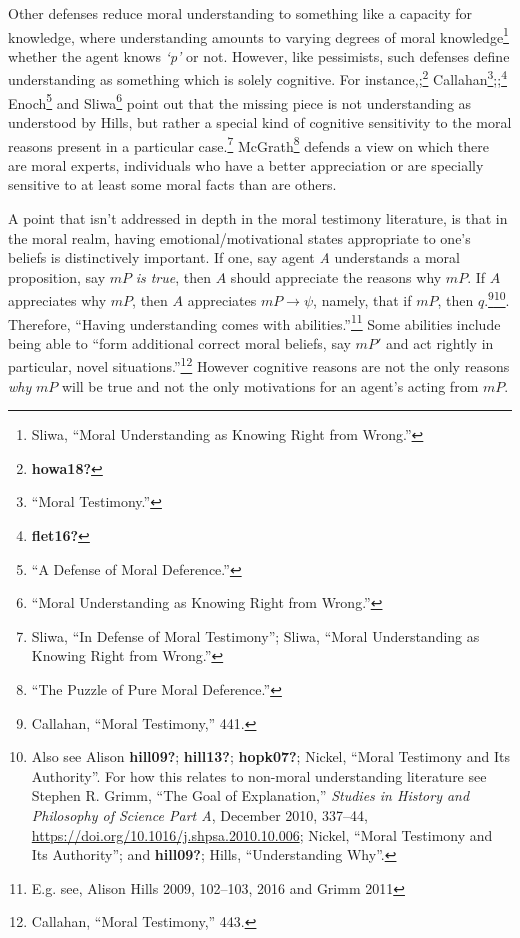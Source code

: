 \documentclass[phdthesis,12pt,final]{wuthesis}
\theoremstyle{definition}
\theoremstyle{definition}
\theoremstyle{definition}
\theoremstyle{definition}
\theoremstyle{remark}
\begin{document}
Other defenses reduce moral understanding to something like a capacity for knowledge, where understanding amounts to varying degrees of moral knowledge\footnote{Sliwa, {``Moral {Understanding} as {Knowing Right} from {Wrong}.''}} whether the agent knows \emph{`p'} or not. However, like pessimists, such defenses define understanding as something which is solely cognitive. For instance,;\footnote{\textbf{howa18?}} Callahan\footnote{{``Moral {Testimony}.''}};;\footnote{\textbf{flet16?}} Enoch\footnote{{``A {Defense} of {Moral Deference}.''}} and Sliwa\footnote{{``Moral {Understanding} as {Knowing Right} from {Wrong}.''}} point out that the missing piece is not understanding as understood by Hills, but rather a special kind of cognitive sensitivity to the moral reasons present in a particular case.\footnote{Sliwa, {``In Defense of Moral Testimony''}; Sliwa, {``Moral {Understanding} as {Knowing Right} from {Wrong}.''}} McGrath\footnote{{``The {Puzzle} of {Pure Moral Deference}.''}} defends a view on which there are moral experts, individuals who have a better appreciation or are specially sensitive to at least some moral facts than are others.

A point that isn't addressed in depth in the moral testimony literature, is that in the moral realm, having emotional/motivational states appropriate to one's beliefs is distinctively important. If one, say agent \emph{A} understands a moral proposition, say \(mP\) \emph{is true}, then \(A\) should appreciate the reasons why \(mP\). If \(A\) appreciates why \(mP\), then \(A\) appreciates \(mP \rightarrow \psi\), namely, that if \(mP\), then \(q\).\footnote{Callahan, {``Moral {Testimony},''} 441.}\footnote{Also see Alison \textbf{hill09?}; \textbf{hill13?}; \textbf{hopk07?}; Nickel, {``Moral {Testimony} and Its {Authority}''}. For how this relates to non-moral understanding literature see Stephen R. Grimm, {``The Goal of Explanation,''} \emph{Studies in History and Philosophy of Science Part A}, December 2010, 337--44, \url{https://doi.org/10.1016/j.shpsa.2010.10.006}; Nickel, {``Moral {Testimony} and Its {Authority}''}; and \textbf{hill09?}; Hills, {``Understanding {Why}''}.}. Therefore, ``Having understanding comes with abilities.''\footnote{E.g. see, Alison Hills 2009, 102--103, 2016 and Grimm 2011} Some abilities include being able to ``form additional correct moral beliefs, say \(mP'\) and act rightly in particular, novel situations.''\footnote{Callahan, {``Moral {Testimony},''} 443.} However cognitive reasons are not the only reasons \emph{why} \(mP\) will be true and not the only motivations for an agent's acting from \(mP\).
\end{document}
